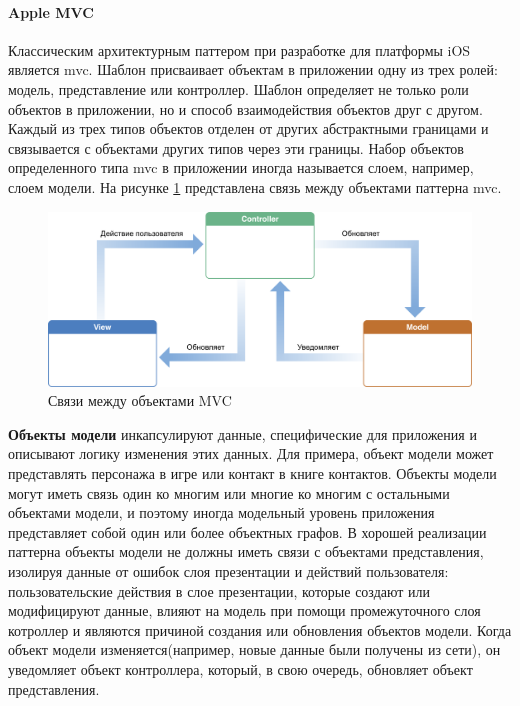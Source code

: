 \paragraph {Apple MVC}
Классическим архитектурным паттером при разработке для платформы iOS является \gls{mvc}. Шаблон присваивает объектам в приложении одну из трех ролей: модель, представление или контроллер. Шаблон определяет не только роли объектов в приложении, но и способ взаимодействия объектов друг с другом. Каждый из трех типов объектов отделен от других абстрактными границами и связывается с объектами других типов через эти границы. Набор объектов определенного типа \gls{mvc} в приложении иногда называется слоем, например, слоем модели. \cite{apple:mvc} На рисунке \ref{sec:analysis:research:mobArch:apple-mvc:image:mvc} представлена связь между объектами паттерна \gls{mvc}.

\begin{figure}[h]
  \centering
    \includegraphics[width=1\textwidth]{inc/img/mvc.png}
  \caption{Связи между объектами MVC}
  \label{sec:analysis:research:mobArch:apple-mvc:image:mvc}
\end{figure}

\textbf{Объекты модели} инкапсулируют данные, специфические для приложения и описывают логику изменения этих данных. Для примера, объект модели может представлять персонажа в игре или контакт в книге контактов. Объекты модели могут иметь связь один ко многим или многие ко многим с остальными объектами модели, и поэтому иногда модельный уровень приложения представляет собой один или более объектных графов. В хорошей реализации паттерна объекты модели не должны иметь связи с объектами представления, изолируя данные от ошибок слоя презентации и действий пользователя: пользовательские действия в слое презентации, которые создают или модифицируют данные, влияют на модель при помощи промежуточного слоя котроллер и являются причиной создания или обновления объектов модели. Когда объект модели изменяется(например, новые данные были получены из сети), он уведомляет объект контроллера, который, в свою очередь, обновляет объект представления.


